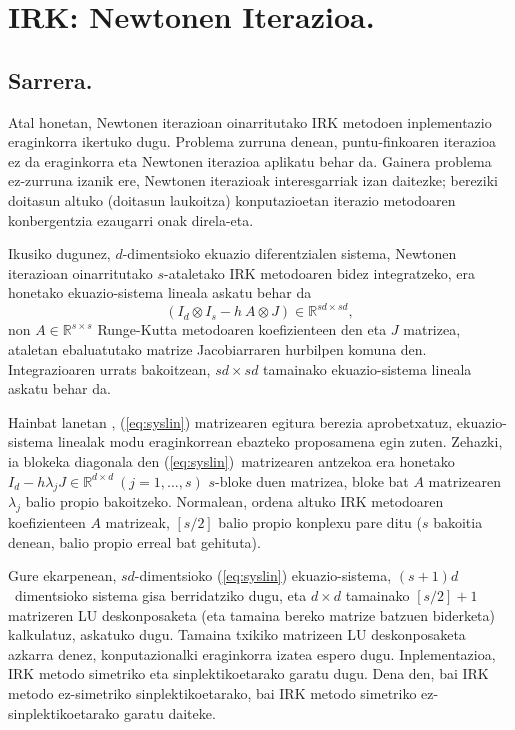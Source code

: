 \chapter{IRK: Newtonen Iterazioa.}
\label{chap:IRK-NEW}

\section{Sarrera.}


Atal honetan, Newtonen iterazioan oinarritutako IRK metodoen inplementazio eraginkorra ikertuko dugu.
Problema zurruna denean, puntu-finkoaren iterazioa ez da eraginkorra eta Newtonen iterazioa aplikatu behar da. Gainera problema ez-zurruna izanik ere, Newtonen iterazioak interesgarriak izan daitezke; bereziki doitasun altuko (doitasun laukoitza) konputazioetan iterazio metodoaren konbergentzia ezaugarri onak direla-eta. 

Ikusiko dugunez, $d$-dimentsioko ekuazio diferentzialen sistema, Newtonen iterazioan oinarritutako $s$-ataletako IRK metodoaren bidez integratzeko, era honetako ekuazio-sistema lineala askatu behar da
\begin{equation}
\label{eq:syslin}
(I_d \otimes I_s- h \ A \otimes J) \in \mathbb{R}^{sd \times sd},
\end{equation} 
non $A \in \mathbb{R}^{s \times s}$ Runge-Kutta metodoaren koefizienteen den eta $J$ matrizea, ataletan ebaluatutako matrize Jacobiarraren  hurbilpen komuna den. Integrazioaren urrats bakoitzean, $sd \times sd$ tamainako ekuazio-sistema lineala askatu behar da.

Hainbat lanetan \cite{Butcher1976,Liniger1970,Bickart1977}, (\ref{eq:syslin}) matrizearen egitura berezia aprobetxatuz, ekuazio-sistema linealak modu eraginkorrean ebazteko proposamena egin zuten. Zehazki, ia blokeka diagonala den (\ref{eq:syslin})~matrizearen antzekoa era honetako $I_d-h \lambda_j J \in \mathbb{R}^{d \times d} \ (j=1,\dots,s)$ $s$-bloke duen matrizea, bloke bat $A$ matrizearen $\lambda_j$ balio propio  bakoitzeko. Normalean, ordena altuko IRK metodoaren koefizienteen $A$ matrizeak, $[s/2]$ balio propio konplexu pare ditu ($s$ bakoitia denean, balio propio erreal bat gehituta).

Gure ekarpenean, $sd$-dimentsioko (\ref{eq:syslin}) ekuazio-sistema, $(s+1)d$~dimentsioko sistema gisa 
berridatziko dugu, eta $d \times d$ tamainako $[s/2]+1$ matrizeren LU deskonposaketa (eta tamaina bereko matrize batzuen biderketa) kalkulatuz, askatuko dugu. Tamaina txikiko matrizeen LU deskonposaketa azkarra denez, konputazionalki eraginkorra izatea espero dugu. Inplementazioa, IRK metodo simetriko eta sinplektikoetarako garatu dugu. Dena den, bai IRK metodo ez-simetriko sinplektikoetarako, bai IRK metodo simetriko ez-sinplektikoetarako garatu daiteke.
 

